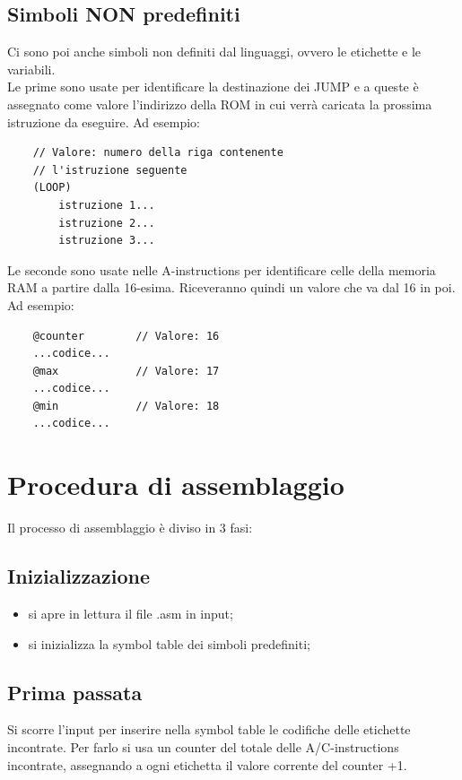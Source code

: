 \documentclass[12pt]{article}
\begin{document}
\subsection{Simboli NON predefiniti}
\label{ssec:simboli_non_predef}
Ci sono poi anche simboli non definiti dal linguaggi, ovvero le etichette e le variabili.
\\
Le prime sono usate per identificare la destinazione dei JUMP e a queste è assegnato come valore l'indirizzo della ROM in cui verrà caricata la prossima istruzione da eseguire. Ad esempio:
\begin{lstlisting}
    // Valore: numero della riga contenente
    // l'istruzione seguente
    (LOOP)
        istruzione 1...
        istruzione 2...
        istruzione 3...
\end{lstlisting}
Le seconde sono usate nelle A-instructions per identificare celle della memoria RAM a partire dalla 16-esima. Riceveranno quindi un valore che va dal 16 in poi. Ad esempio:
\begin{lstlisting}
    @counter        // Valore: 16
    ...codice...
    @max            // Valore: 17
    ...codice...
    @min            // Valore: 18
    ...codice...
\end{lstlisting}

\section{Procedura di assemblaggio}
\label{sec:proc_assemblaggio}
Il processo di assemblaggio è diviso in 3 fasi:

\subsection{Inizializzazione}
\label{ssec:proc_init}
\begin{itemize}
    \item si apre in lettura il file .asm in input;
    \item si inizializza la symbol table dei simboli predefiniti;
\end{itemize}

\subsection{Prima passata}
\label{proc_first}
Si scorre l'input per inserire nella symbol table le codifiche delle etichette incontrate.
Per farlo si usa un counter del totale delle A/C-instructions incontrate, assegnando a ogni etichetta il valore corrente del counter +1.
\end{document}
